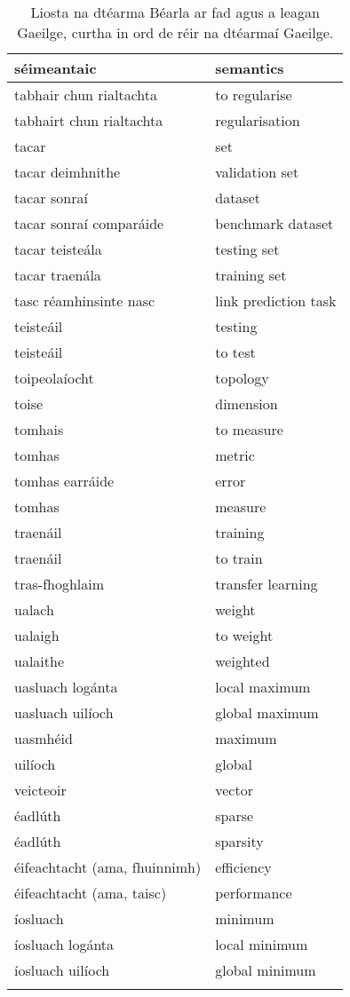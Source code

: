 \documentclass{article}
\begin{document}
\begin{longtable}{|l|l|}
		séimeantaic&semantics\\ \hline 
		tabhair chun rialtachta&to regularise\\ \hline 
		tabhairt chun rialtachta&regularisation\\ \hline 
		tacar&set\\ \hline 
		tacar deimhnithe&validation set\\ \hline 
		tacar sonraí&dataset\\ \hline 
		tacar sonraí comparáide&benchmark dataset\\ \hline 
		tacar teisteála&testing set\\ \hline 
		tacar traenála&training set\\ \hline 
		tasc réamhinsinte nasc&link prediction task\\ \hline 
		teisteáil&testing\\ \hline 
		teisteáil&to test\\ \hline 
		toipeolaíocht&topology\\ \hline 
		toise&dimension\\ \hline 
		tomhais&to measure\\ \hline 
		tomhas&metric\\ \hline 
		tomhas earráide&error\\ \hline 
		tomhas&measure\\ \hline 
		traenáil&training\\ \hline 
		traenáil&to train\\ \hline 
		tras-fhoghlaim&transfer learning\\ \hline 
		ualach&weight\\ \hline 
		ualaigh&to weight\\ \hline 
		ualaithe&weighted\\ \hline 
		uasluach logánta&local maximum\\ \hline 
		uasluach uilíoch&global maximum\\ \hline 
		uasmhéid&maximum\\ \hline 
		uilíoch&global\\ \hline 
		veicteoir&vector\\ \hline 
		éadlúth&sparse\\ \hline 
		éadlúth&sparsity\\ \hline 
		éifeachtacht (ama, fhuinnimh)&efficiency\\ \hline 
		éifeachtacht (ama, taisc)&performance\\ \hline 
		íosluach&minimum\\ \hline 
		íosluach logánta&local minimum\\ \hline 
		íosluach uilíoch&global minimum\\ \hline 
\caption{Liosta na dtéarma Béarla ar fad agus a leagan Gaeilge, curtha in ord de réir na dtéarmaí Gaeilge.}
\label{tab-terms-ga-en}
\end{longtable}
\end{document}
